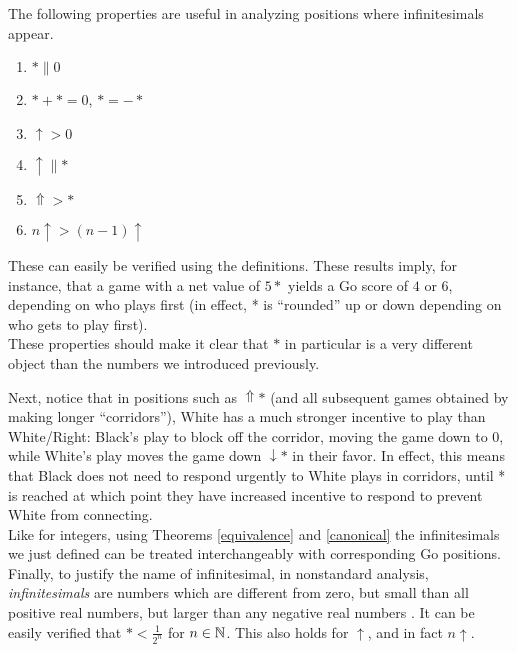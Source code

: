 \documentclass[../math194_paper.tex]{subfiles}
\begin{document}
The following properties are useful in analyzing positions where infinitesimals appear.
\begin{theorem} \:
    \begin{enumerate}
        \item $* \parallel 0$
        \item $*+*=0$, $*=-*$
        \item $\uparrow > 0$
        \item $\uparrow \parallel *$
        \item $\Uparrow > *$
        \item $n \uparrow > (n-1) \uparrow$
    \end{enumerate}
\end{theorem}
These can easily be verified using the definitions. These results imply, for instance, that 
a game with a net value of $5*$ yields a Go score of $4$ or $6$, depending on who plays first 
(in effect, * is ``rounded'' up or down depending on who gets to play first). \\

These properties should make it clear that $*$ in particular is a very different object than the 
numbers we introduced previously.

Next, notice that in positions such as $\Uparrow*$ (and all subsequent games obtained 
by making longer ``corridors''), White has a much stronger incentive to play than 
White/Right: Black's play to block off the corridor, moving the game down to 0, while 
White's play moves the game down $\downarrow*$ in their favor. In effect, this means 
that Black does not need to respond urgently to White plays in corridors, until 
* is reached at which point they have increased incentive to respond to prevent White from connecting.
\\

Like for integers, using Theorems \ref{equivalence} and \ref{canonical} the infinitesimals 
we just defined can be treated interchangeably with corresponding Go positions. \\


Finally, to justify the name of infinitesimal, in nonstandard analysis, \textit{infinitesimals} are numbers
which are different from zero, but small than all positive real numbers, but larger than any negative
real numbers \cite{robinson2016non}. It can be easily verified that $* < \frac{1}{2^n}$ for $n \in \mathbb{N}$. 
This also holds for $\uparrow$, and in fact $n \uparrow$.
\end{document}
